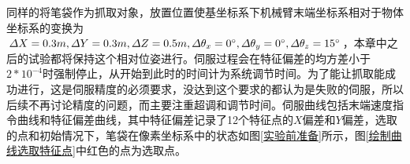 \documentclass[fontset=fandol,type=bachelor,campus=harbin,bsmainpagenumberline=true]{hithesisbook}
\begin{document}
同样的将笔袋作为抓取对象，放置位置使基坐标系下机械臂末端坐标系相对于物体坐标系的变换为$\varDelta X=0.3m,\varDelta Y=0.3m,\varDelta Z=0.5m,\varDelta \theta _x=0\degree,\varDelta \theta _y=0\degree,\varDelta \theta _z=15\degree$，本章中之后的试验都将保持这个相对位姿进行。伺服过程会在特征偏差的均方差小于$2*10^{-4}$时强制停止，从开始到此时的时间计为系统调节时间。为了能让抓取能成功进行，这是伺服精度的必须要求，没达到这个要求的都认为是失败的伺服，所以后续不再讨论精度的问题，而主要注重超调和调节时间。伺服曲线包括末端速度指令曲线和特征偏差曲线，其中特征偏差记录了12个特征点的$X$偏差和$Y$偏差，选取的点和初始情况下，笔袋在像素坐标系中的状态如图\ref{实验前准备}所示，图\ref{绘制曲线选取特征点}中红色的点为选取点。
\begin{figure}[h]
	\centering
\end{figure}
\end{document}
